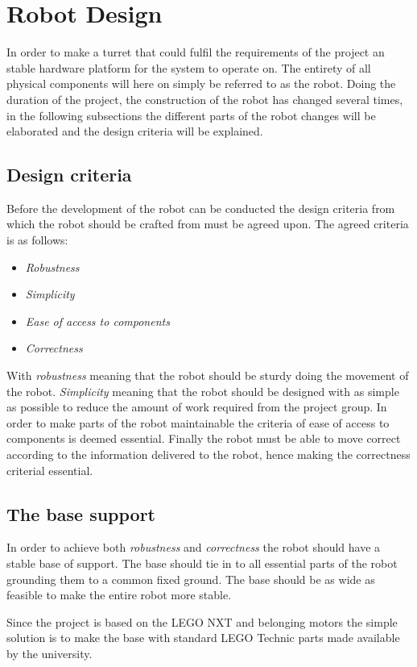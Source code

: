 \section{Robot Design}\label{Design:Robot}
In order to make a turret that could fulfil the requirements of the project an stable hardware platform for the system to operate on. 
The entirety of all physical components will here on simply be referred to as the robot.
Doing the duration of the project, the construction of the robot has changed several times, in the following subsections the different parts of the robot changes will be elaborated and the design criteria will be explained. 

\subsection{Design criteria}
Before the development of the robot can be conducted the design criteria from which the robot should be crafted from must be agreed upon. 
The agreed criteria is as follows:
\begin{itemize}
\item \textit{Robustness}
\item \textit{Simplicity}
\item \textit{Ease of access to components}
\item \textit{Correctness}
\end{itemize}

With \textit{robustness} meaning that the robot should be sturdy doing the movement of the robot.
\textit{Simplicity} meaning that the robot should be designed with as simple as possible to reduce the amount of work required from the project group. 
In order to make parts of the robot maintainable the criteria of ease of access to components is deemed essential. 
Finally the robot must be able to move correct according to the information delivered to the robot, hence making the correctness criterial essential. 

\subsection{The base support}
In order to achieve both \textit{robustness} and \textit{correctness} the robot should have a stable base of support. 
The base should tie in to all essential parts of the robot grounding them to a common fixed ground.
The base should be as wide as feasible to make the entire robot more stable. 

Since the project is based on the LEGO NXT and belonging motors the simple solution is to make the base with standard LEGO Technic parts made available by the university. 



